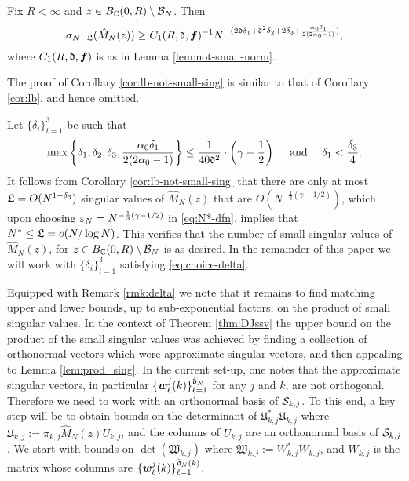 \documentclass{amsart}
\numberwithin{equation}{section}
\def\corAB{}
\def\corOZ{}
\def\corABrev{\textcolor{black}}
\begin{document}
\begin{corollary}\label{cor:lb-not-small-sing}
Fix $R<\infty$ and $z \in B_{\mathbb{C}}(0,R) \setminus \mathcal{B}_N$. Then
  \[
    \sigma_{N-\gL}(\hat{M}_N(z)) \geq C_1(R,\gd, {\bm f})^{-1} N^{-(2\gd\delta_1+ \gd^2 \delta_2+2\delta_3+\corABrev{\frac{\alpha_0\delta_1}{2(2\alpha_0-1)}})},
  \]
where $C_1(R,\mathfrak{d}, {\bm f})$ is as in Lemma \ref{lem:not-small-norm}.
\end{corollary}
\corAB{The proof of Corollary \ref{cor:lb-not-small-sing} is similar to that of Corollary \ref{cor:lb}, and hence omitted.}
\begin{remark}\label{rmk:delta}
 Let $\{\delta_i\}_{i=1}^3$ be such that
 \begin{equation}\label{eq:choice-delta}
 \max\left\{\delta_1,\delta_2,\delta_3, \corABrev{\frac{\alpha_0\delta_1}{2(2\alpha_0-1)}}\right\} \le \frac{1}{\corABrev{40}\gd^2} \cdot \left(\gamma - \frac{1}{2}\right) \quad \text{ and } \quad \delta_1 < \frac{\delta_3}{4}.
 \end{equation}
 It follows from Corollary \ref{cor:lb-not-small-sing} that there are only at most $\mathfrak{L}=O(N^{1-\delta_3})$ singular values of $\hat{M}_N(z)$ that are $O(N^{-\frac{1}{3}(\gamma-1/2)})$, which upon choosing $\varepsilon_N= N^{-\frac{1}{3}(\gamma-1/2)}$ in \eqref{eq:N*-dfn}, implies that $N^* \le \mathfrak{L} = o(N/\log N)$. This verifies that the number of small singular values of $\hat{M}_N(z)$, for $z \in B_{\mathbb{C}}(0,R)\setminus \mathcal{B}_N$ is as desired. In the remainder of this paper we will work with $\{\delta_i\}_{i=1}^3$ satisfying \eqref{eq:choice-delta}.
\end{remark}

Equipped with Remark \ref{rmk:delta} we note that it remains
to find  matching upper and lower bounds, up to sub-exponential factors,
on the product of small singular values. \corAB{In the context of Theorem \ref{thm:DJssv} the upper bound on the product of the small singular values}
\corOZ{was} \corAB{achieved by finding a collection of orthonormal vectors}
\corOZ{which were}
\corAB{approximate singular vectors, and then appealing to Lemma \ref{lem:prod_sing}.
In the current set-up, one notes that the approximate singular vectors, in particular $\{{\bm w}_\ell^j(k)\}_{\ell=1}^{\hat{\mathfrak{d}}_N}$ for any $j$ and $k$, are not orthogonal. Therefore we need to work with an orthonormal basis of ${\mathcal{S}}_{k,j}$. To this end,} a key
\corOZ{step}
will be to obtain bounds on the determinant of $\mathfrak{U}_{k,j}^*\mathfrak{U}_{k,j}$ where $\mathfrak{U}_{k,j}:=\pi_{k,j} \hat{M}_N(z) U_{k,j}$, and the columns of $U_{k,j}$ \corOZ{are} an orthonormal basis of $\mathcal{S}_{k,j}$.
We start with bounds on $\det(\mathfrak{W}_{k,j})$ where $\mathfrak{W}_{k,j}:=W_{k,j}^*W_{k,j}$, and \corAB{$W_{k,j}$} \corOZ{is} the matrix whose columns are $\{{\bm w}^j_\ell(k)\}_{\ell=1}^{\hat{\mathfrak{d}}_N(k)}$.
\end{document}
